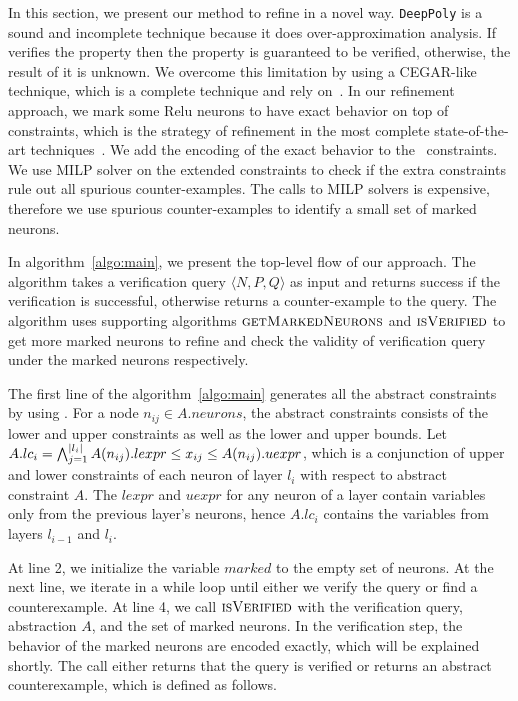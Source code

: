 In this section, we present our method to refine \deeppoly in a novel way.
%
\texttt{DeepPoly} is a sound and incomplete technique because it does over-approximation analysis. 
If \deeppoly{} verifies the property then the property is guaranteed to be verified, otherwise, the
result of it is unknown. 
We overcome this limitation by using a CEGAR-like technique, which is a complete technique
and rely on~\deeppoly{}. 
In our refinement approach, we mark some Relu neurons to have exact behavior on top
of~\deeppoly{} constraints, which is the strategy of refinement in the most complete
state-of-the-art techniques~\cite{alphabeta,etc}.
We add the encoding of the exact behavior to the~\deeppoly{} constraints.
%
We use MILP solver on the extended constraints to
check if the extra constraints rule out all spurious counter-examples.
%
The calls to MILP solvers is expensive,
therefore
we use spurious counter-examples to identify a small set of marked neurons.


In algorithm~\ref{algo:main}, we present the top-level flow of our approach.
The algorithm takes a verification query $\langle N,P,Q \rangle$ as input and returns
success if the verification is successful, otherwise
returns a counter-example to the query.
The algorithm uses supporting algorithms $\textsc{getMarkedNeurons}$ and
$\textsc{isVerified}$ to
get more marked neurons to refine and check the validity of verification query under
the marked neurons respectively.

The first line of the algorithm~\ref{algo:main} generates all the abstract constraints
by using \deeppoly{}.
For a node $n_{ij} \in A.neurons$,
the abstract constraints consists of the lower and upper constraints as well as the lower and upper bounds.
Let $A.lc_i = \bigwedge_{j=1}^{|l_i|} A(n_{ij}).lexpr \leq x_{ij} \leq  A(n_{ij}).uexpr$, which is a 
conjunction of upper and lower constraints of each neuron of layer $l_i$ with respect to abstract constraint $A$.
The $lexpr$ and $uexpr$ for any neuron of a layer contain variables only from the previous layer's neurons, 
hence $A.lc_i$ contains the variables from layers $l_{i-1}$ and $l_i$. 


%
At line 2, we initialize the variable $marked$ to the empty set of neurons.
%
At the next line, we iterate in a while loop until either we verify the query or
find a counterexample.
%
At line 4, we call $\textsc{isVerified}$ with the verification query, abstraction $A$, and the
set of marked neurons.
%
In the verification step, the behavior of the marked neurons are encoded exactly, which
will be explained shortly.
%
The call either returns that the query is verified or returns an abstract counterexample,
which is defined as follows.

